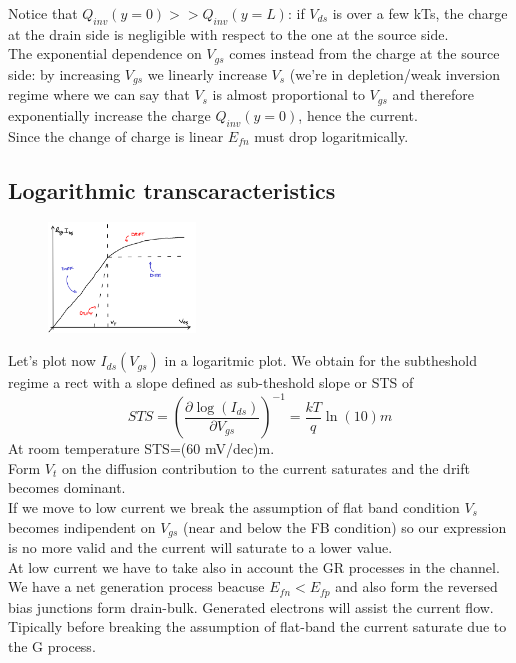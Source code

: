 Notice that $Q_{inv}(y=0)>>Q_{inv}(y=L)$: if $V_{ds}$ is over a few kTs, the charge at the drain side is negligible with respect to the one at the source side.\\
The exponential dependence on $V_{gs}$ comes instead from the charge at the source side: by increasing $V_{gs}$ we linearly increase $V_s$ (we're in depletion/weak inversion regime where we can say that $V_s$ is almost proportional to $V_{gs}$ and therefore exponentially increase the charge $Q_{inv}(y=0)$, hence the current.\\
Since the change of charge is linear $E_{fn}$ must drop logaritmically.\\


\subsection{Logarithmic transcaracteristics }

\begin{figure}
\includegraphics[width=0.35\textwidth]{tranclog.png}
\end{figure}

Let's plot now $I_{ds}(V_{gs})$ in a logaritmic plot. We obtain for the subtheshold regime a rect with a slope defined as sub-theshold slope or STS of 
\begin{equation}
STS=\left(\frac{\partial \log(I_{ds})}{\partial V_{gs}}\right)^{-1}=\frac{kT}{q}\ln(10)m
\end{equation} 
At room temperature STS=(60 mV/dec)m.\\ 
Form $V_t$ on the diffusion contribution to the current saturates and the drift becomes dominant.\\
If we move to low current we break the assumption of flat band condition $V_s$ becomes indipendent on $V_{gs}$ (near and below the FB condition) so our expression is no more valid and the current will saturate to a lower value.\\
At low current we have to take also in account the GR processes in the channel. We have a net generation process beacuse $E_{fn}<E_{fp}$ and also form the reversed bias junctions form drain-bulk. Generated electrons will assist the current flow. Tipically before breaking the assumption of flat-band the current saturate due to the G process.\\


